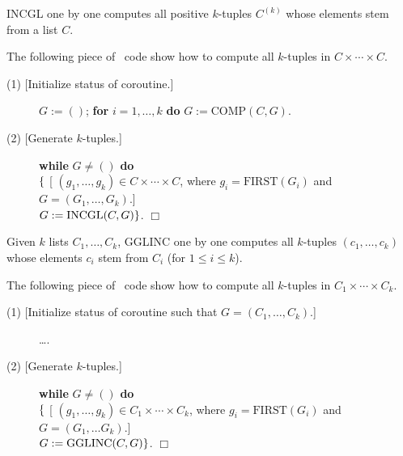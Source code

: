 INCGL one by one computes all positive $k$-tuples $C^{(k)}$ whose elements 
stem from a list $C$.
\begin{example} 
 The following piece of  \ALDES\ code show how to compute all
 $k$-tuples in $C \times \cdots \times C$.
 \begin{description} 
      \item[{(1) [Initialize status of coroutine.]}] \( G:=() \);  
      {\bf for} \( i = 1, \ldots, k \) {\bf do} \( G:=\mbox{COMP}(C,G) \). 
      \item[{(2) [Generate $k$-tuples.]}] 
         {\bf while} \(G \neq () \) {\bf do} \\ 
        $\bf \{$ [ \( (g_1,\ldots, g_k) \in C \times \cdots \times C \),
        where $g_i= \mbox{FIRST}(G_i)$ and \( G = (G_1, \ldots, G_k) \).] \\
      \( G:=\mbox{INCGL}(C,G) {\bf \}} \). \hfill $\Box$
 \end{description}
\end{example}

Given $k$ lists $C_1,\ldots,C_k$, GGLINC one by one computes all $k$-tuples 
$(c_1,\ldots,c_k)$ whose elements $c_i$ stem from $C_i$ 
(for $1 \leq i \leq k$).
\begin{example}
 The following piece of  \ALDES\ code show how to compute all 
 $k$-tuples in $C_1 \times \cdots \times C_k$.
 \begin{description}
      \item[{(1) [Initialize status of coroutine such that 
             \( G =(C_1,\ldots,C_k) \).] }]
       \ldots. 
      \item[{(2) [Generate $k$-tuples.]}] {\bf while} \(G \neq () \) {\bf do} \\
        $\bf \{$ [ \( (g_1,\ldots, g_k) \in C_1 \times \cdots \times C_k \),
        where $g_i= \mbox{FIRST}(G_i)$ and \( G = (G_1, \ldots G_k) \).] \\
        \( G:=\mbox{GGLINC}(C,G) {\bf \}} \). \hfill $\Box$
 \end{description}
\end{example}
